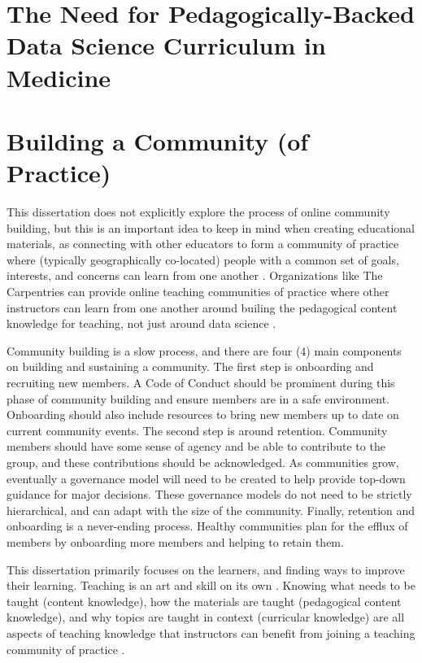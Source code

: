 \documentclass[../main.tex]{subfiles}
\begin{document}
    \section{The Need for Pedagogically-Backed Data Science Curriculum in Medicine}
        \label{se:intro-ds-edu-gaps}

        

    \section{Building a Community (of Practice)}

        This dissertation does not explicitly explore the process of online community building,
        but this is an important idea to keep in mind when creating educational materials,
        as connecting with other educators to form a community of practice
        where (typically geographically co-located) people with a common set of goals, interests, and concerns
        can learn from one another
        \cite{wilson2019teaching}.
        Organizations like The Carpentries can provide online teaching communities of practice
        where other instructors can learn from one another around
        builing the pedagogical content knowledge for teaching, not just around data science
        \cite{CarpentriesHowWe, shulmanThoseWhoUnderstand1986}.

        Community building is a slow process, and there are four (4) main components on building and sustaining a community.
        The first step is onboarding and recruiting new members.
        A Code of Conduct should be prominent during this phase of community building and ensure members are in a safe environment.
        Onboarding should also include resources to bring new members up to date on current community events.
        The second step is around retention.
        Community members should have some sense of agency and be able to contribute to the group,
        and these contributions should be acknowledged.
        As communities grow, eventually a governance model will need to be created to help
        provide top-down guidance for major decisions.
        These governance models do not need to be strictly hierarchical,
        and can adapt with the size of the community.
        Finally, retention and onboarding is a never-ending process.
        Healthy communities plan for the efflux of members by onboarding more members and helping to retain them.

        This dissertation primarily focuses on the learners, and finding ways to improve their learning.
        Teaching is an art and skill on its own
        \cite{greenBuildingBetterTeacher2014, wilson2019teaching}.
        Knowing what needs to be taught (content knowledge),
        how the materials are taught (pedagogical content knowledge), and
        why topics are taught in context (curricular knowledge)
        are all aspects of teaching knowledge that instructors can benefit from joining a teaching
        community of practice
        \cite{shulmanThoseWhoUnderstand1986, greenBuildingBetterTeacher2014, wilson2019teaching}.
\end{document}
